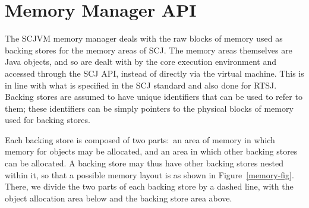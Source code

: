 \section{Memory Manager API}
\label{memory-manager-section}

The SCJVM memory manager deals with the raw blocks of memory used as
backing stores for the memory areas of SCJ.
The memory areas themselves are Java objects, and so are dealt with by
the core execution environment and accessed through the SCJ API,
instead of directly via the virtual machine.
This is in line with what is specified in the SCJ standard and also
done for RTSJ.
Backing stores are assumed to have unique identifiers that can be used
to refer to them; these identifiers can be simply pointers to the
physical blocks of memory used for backing stores.

Each backing store is composed of two parts:~an area of memory in
which memory for objects may be allocated, and an area in which other
backing stores can be allocated.
A backing store may thus have other backing stores nested within it,
so that a possible memory layout is as shown in
Figure~\ref{memory-fig}.
There, we divide the two parts of each backing store by a dashed line,
with the object allocation area below and the backing store area
above.

